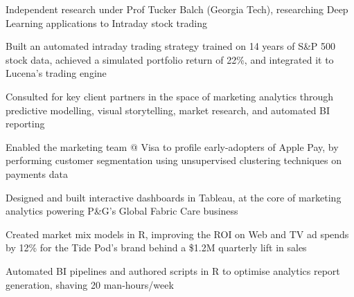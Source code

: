 \documentclass[]{deedy-resume-reversed}
\begin{document}
\begin{minipage}[t]{0.66\textwidth}
\begin{tightemize}
\item Independent research under Prof Tucker Balch (Georgia Tech), researching Deep Learning applications to Intraday stock trading
\item Built an automated intraday trading strategy trained on 14 years of S\&P 500 stock data, achieved a simulated portfolio return of 22\%, and integrated it to Lucena's trading engine
\end{tightemize}
\sectionsep
\sectionsep

\begin{tightemize}
\item Consulted for key client partners in the space of marketing analytics through predictive modelling, visual storytelling, market research, and automated BI reporting
\item Enabled the marketing team @ Visa to profile early-adopters of Apple Pay, by performing customer segmentation using unsupervised clustering techniques on payments data 
\item Designed and built interactive dashboards in Tableau, at the core of marketing analytics powering P\&G's Global Fabric Care business
\item Created market mix models in R, improving the ROI on Web and TV ad spends by 12\% for the Tide Pod's brand behind a \$1.2M quarterly lift in sales
\item Automated BI pipelines and authored scripts in R to optimise analytics report generation, shaving 20 man-hours/week
\end{tightemize}
\sectionsep
\sectionsep



%
%

\end{minipage}
\hfill
\end{document}

